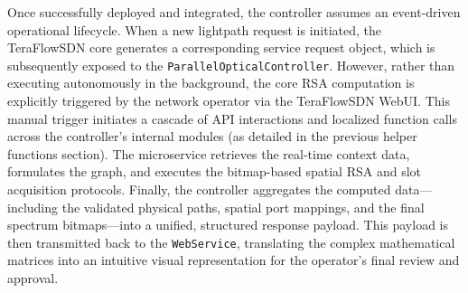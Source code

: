 Once successfully deployed and integrated, the controller assumes an event-driven operational lifecycle. When a new lightpath request is initiated, the TeraFlowSDN core generates a corresponding service request object, which is subsequently exposed to the \texttt{ParallelOpticalController}. However, rather than executing autonomously in the background, the core RSA computation is explicitly triggered by the network operator via the TeraFlowSDN WebUI. This manual trigger initiates a cascade of API interactions and localized function calls across the controller's internal modules (as detailed in the previous helper functions section). The microservice retrieves the real-time context data, formulates the graph, and executes the bitmap-based spatial RSA and slot acquisition protocols. Finally, the controller aggregates the computed data—including the validated physical paths, spatial port mappings, and the final spectrum bitmaps—into a unified, structured response payload. This payload is then transmitted back to the \texttt{WebService}, translating the complex mathematical matrices into an intuitive visual representation for the operator's final review and approval.